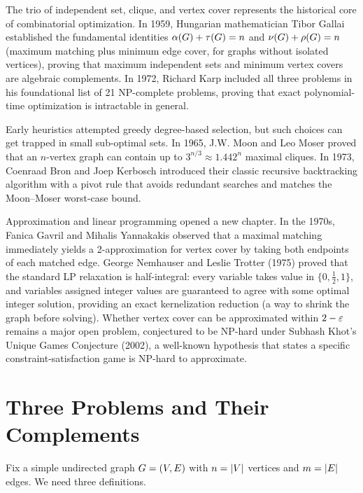 \begin{historybox}
The trio of independent set, clique, and vertex cover represents the historical core of
combinatorial optimization. In 1959, Hungarian mathematician Tibor Gallai established the
fundamental identities $\alpha(G) + \tau(G) = n$ and $\nu(G) + \rho(G) = n$ (maximum matching plus minimum edge cover, for graphs without isolated vertices),
proving that maximum independent sets and minimum vertex covers are algebraic complements.
In 1972, Richard Karp included all three problems in his foundational list of 21 NP-complete
problems, proving that exact polynomial-time optimization is intractable in general.

Early heuristics attempted greedy degree-based selection, but such choices can get trapped
in small sub-optimal sets. In 1965, J.W. Moon and Leo Moser proved that an $n$-vertex graph
can contain up to $3^{n/3} \approx 1.442^n$ maximal cliques. In 1973, Coenraad Bron and Joep
Kerbosch introduced their classic recursive backtracking algorithm with a pivot rule that
avoids redundant searches and matches the Moon--Moser worst-case bound.

Approximation and linear programming opened a new chapter. In the 1970s, Fanica Gavril and
Mihalis Yannakakis observed that a maximal matching immediately yields a 2-approximation for
vertex cover by taking both endpoints of each matched edge. George Nemhauser and Leslie
Trotter (1975) proved that the standard LP relaxation is half-integral: every variable takes
value in $\{0, \tfrac{1}{2}, 1\}$, and variables assigned integer values are guaranteed to agree with some optimal integer solution, providing an exact kernelization reduction (a way to shrink the graph before solving).
Whether vertex cover can be approximated within $2-\varepsilon$ remains a major open problem,
conjectured to be NP-hard under Subhash Khot's Unique Games Conjecture (2002), a well-known hypothesis that states a specific constraint-satisfaction game is NP-hard to approximate.
\end{historybox}

\chapterline

\section{Three Problems and Their Complements}
\label{ch29:trinity}

Fix a simple undirected graph $G=(V,E)$ with $n=\lvert V\rvert$ vertices and
$m=\lvert E\rvert$ edges. We need three definitions.

